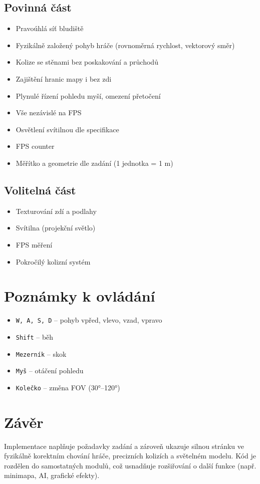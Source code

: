\documentclass[12pt,a4paper]{article}
\begin{document}
\subsection*{Povinná část}
\begin{itemize}
    \item Pravoúhlá síť bludiště
    \item Fyzikálně založený pohyb hráče (rovnoměrná rychlost, vektorový směr)
    \item Kolize se stěnami bez poskakování a průchodů
    \item Zajištění hranic mapy i bez zdi
    \item Plynulé řízení pohledu myší, omezení přetočení
    \item Vše nezávislé na FPS
    \item Osvětlení svítilnou dle specifikace
    \item FPS counter
    \item Měřítko a geometrie dle zadání (1 jednotka = 1 m)
\end{itemize}

\subsection*{Volitelná část}
\begin{itemize}
    \item Texturování zdí a podlahy
    \item Svítilna (projekční světlo)
    \item FPS měření
    \item Pokročilý kolizní systém
\end{itemize}

\section{Poznámky k ovládání}
\begin{itemize}
    \item \texttt{W, A, S, D} – pohyb vpřed, vlevo, vzad, vpravo
    \item \texttt{Shift} – běh
    \item \texttt{Mezerník} – skok
    \item \texttt{Myš} – otáčení pohledu
    \item \texttt{Kolečko} – změna FOV (30°–120°)
\end{itemize}

\section{Závěr}
Implementace naplňuje požadavky zadání a zároveň ukazuje silnou stránku ve fyzikálně korektním chování hráče, precizních kolizích a světelném modelu. Kód je rozdělen do samostatných modulů, což usnadňuje rozšiřování o další funkce (např. minimapa, AI, grafické efekty).
\end{document}

